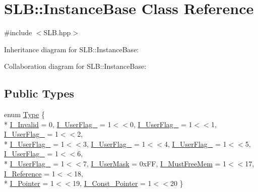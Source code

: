 \hypertarget{classSLB_1_1InstanceBase}{}\section{S\+LB\+:\+:Instance\+Base Class Reference}
\label{classSLB_1_1InstanceBase}


{\ttfamily \#include $<$S\+L\+B.\+hpp$>$}



Inheritance diagram for S\+LB\+:\+:Instance\+Base\+:


Collaboration diagram for S\+LB\+:\+:Instance\+Base\+:
\subsection*{Public Types}
\begin{DoxyCompactItemize}
\item 
enum \hyperlink{classSLB_1_1InstanceBase_a041cb4dfc80fe3f13e7b8b9fa83854ac}{Type} \{ \\*
\hyperlink{classSLB_1_1InstanceBase_a041cb4dfc80fe3f13e7b8b9fa83854aca919fb60d70d19909ceb6952a6325b292}{I\+\_\+\+Invalid} = 0, 
\hyperlink{classSLB_1_1InstanceBase_a041cb4dfc80fe3f13e7b8b9fa83854aca71113a89efbbe3dda0ae55f0862d5f7f}{I\+\_\+\+User\+Flag\+\_} = 1$<$$<$0, 
\hyperlink{classSLB_1_1InstanceBase_a041cb4dfc80fe3f13e7b8b9fa83854acaeeebda649a4c373dbb353d601009d242}{I\+\_\+\+User\+Flag\+\_} = 1$<$$<$1, 
\hyperlink{classSLB_1_1InstanceBase_a041cb4dfc80fe3f13e7b8b9fa83854aca1b01fa4cbbc3c82f465240ce55fa8337}{I\+\_\+\+User\+Flag\+\_} = 1$<$$<$2, 
\\*
\hyperlink{classSLB_1_1InstanceBase_a041cb4dfc80fe3f13e7b8b9fa83854acad54371db542b882e264f1804e68ab584}{I\+\_\+\+User\+Flag\+\_} = 1$<$$<$3, 
\hyperlink{classSLB_1_1InstanceBase_a041cb4dfc80fe3f13e7b8b9fa83854aca9e867f4d974107cac8a72cbd2fbb856a}{I\+\_\+\+User\+Flag\+\_} = 1$<$$<$4, 
\hyperlink{classSLB_1_1InstanceBase_a041cb4dfc80fe3f13e7b8b9fa83854acadc864d8056efe999f43cc1ba04982fc6}{I\+\_\+\+User\+Flag\+\_} = 1$<$$<$5, 
\hyperlink{classSLB_1_1InstanceBase_a041cb4dfc80fe3f13e7b8b9fa83854acab71492524228c7d0d063452c733e7bdd}{I\+\_\+\+User\+Flag\+\_} = 1$<$$<$6, 
\\*
\hyperlink{classSLB_1_1InstanceBase_a041cb4dfc80fe3f13e7b8b9fa83854acae6c66101ae8060aadf635db620abd7ec}{I\+\_\+\+User\+Flag\+\_} = 1$<$$<$7, 
\hyperlink{classSLB_1_1InstanceBase_a041cb4dfc80fe3f13e7b8b9fa83854aca91399437f1cfa4bab5f4868b36addfef}{I\+\_\+\+User\+Mask} = 0x\+FF, 
\hyperlink{classSLB_1_1InstanceBase_a041cb4dfc80fe3f13e7b8b9fa83854aca5908c1f30cfe5ffa7ff2986a946bab5c}{I\+\_\+\+Must\+Free\+Mem} = 1$<$$<$17, 
\hyperlink{classSLB_1_1InstanceBase_a041cb4dfc80fe3f13e7b8b9fa83854aca0b0601d284a6700355edf5ea83b379be}{I\+\_\+\+Reference} = 1$<$$<$18, 
\\*
\hyperlink{classSLB_1_1InstanceBase_a041cb4dfc80fe3f13e7b8b9fa83854aca782ba6cd08b083a6770bdb602b4f151e}{I\+\_\+\+Pointer} = 1$<$$<$19, 
\hyperlink{classSLB_1_1InstanceBase_a041cb4dfc80fe3f13e7b8b9fa83854acaad4a6ada25d294819b89de65fdd1a465}{I\+\_\+\+Const\+\_\+\+Pointer} = 1$<$$<$20
 \}
\end{DoxyCompactItemize}
